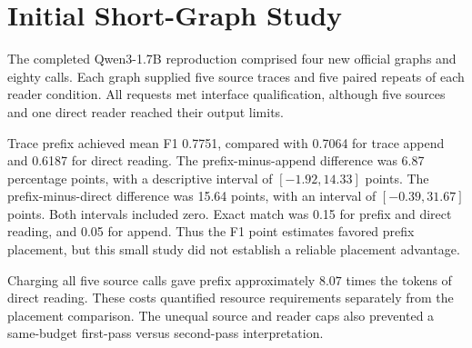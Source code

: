 \section{Initial Short-Graph Study}
\label{app:initial-short-study}
The completed Qwen3-1.7B reproduction comprised four new official graphs and eighty calls. Each graph supplied five source traces and five paired repeats of each reader condition. All requests met interface qualification, although five sources and one direct reader reached their output limits.

Trace prefix achieved mean F1 0.7751, compared with 0.7064 for trace append and 0.6187 for direct reading. The prefix-minus-append difference was 6.87 percentage points, with a descriptive interval of $[-1.92,14.33]$ points. The prefix-minus-direct difference was 15.64 points, with an interval of $[-0.39,31.67]$ points. Both intervals included zero. Exact match was 0.15 for prefix and direct reading, and 0.05 for append. Thus the F1 point estimates favored prefix placement, but this small study did not establish a reliable placement advantage.

Charging all five source calls gave prefix approximately $8.07$ times the tokens of direct reading. These costs quantified resource requirements separately from the placement comparison. The unequal source and reader caps also prevented a same-budget first-pass versus second-pass interpretation.

